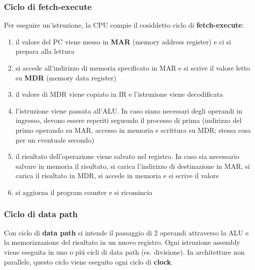 \documentclass{article}
\begin{document}
\subsubsection{Ciclo di fetch-execute}
Per eseguire un'istruzione, la CPU compie il cosiddetto ciclo di \textbf{fetch-execute}:
\begin{enumerate}
	\item il valore del PC viene messo in \textbf{MAR} (memory address register) e ci si prepara alla lettura
	\item si accede all'indirizzo di memoria specificato in MAR e si scrive il valore letto su \textbf{MDR} (memory data register)
	\item il valore di MDR viene copiato in IR e l'istruzione viene decodificata
	\item l'istruzione viene passata all'ALU. In caso siano necessari degli operandi in ingresso, devono essere reperiti seguendo il processo di prima (indirizzo del primo operando su MAR, accesso in memoria e scrittura su MDR; stessa cosa per un eventuale secondo)
	\item il risultato dell'operazione viene salvato nel registro. In caso sia necessario salvare in memoria il risultato, si carica l'indirizzo di destinazione in MAR, si carica il risultato in MDR, si accede in memoria e si scrive il valore
	\item si aggiorna il program counter e si ricomincia
\end{enumerate}

\subsubsection{Ciclo di data path}
Con ciclo di \textbf{data path} si intende il passaggio di 2 operandi attraverso la ALU e la memorizzazione del risultato in un nuovo registro. Ogni istruzione assembly viene eseguita in uno o piú cicli di data path (es. divisione). In architetture non parallele, questo ciclo viene eseguito ogni ciclo di \textbf{clock}.
\end{document}
